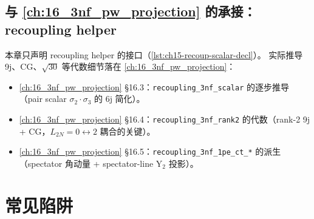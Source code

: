\subsection{与 \cref{ch:16_3nf_pw_projection} 的承接：recoupling helper}
\label{subsec:ch15-coupling-pw-proj}

本章只声明 recoupling helper 的接口（\cref{lst:ch15-recoup-scalar-decl}）。
实际推导 9j、CG、\(\sqrt{30}\) 等代数细节落在 \cref{ch:16_3nf_pw_projection}：
\begin{itemize}
\item \cref{ch:16_3nf_pw_projection} \S 16.3：\texttt{recoupling\_3nf\_scalar}
      的逐步推导（pair scalar \(\sigma_2 \cdot \sigma_3\) 的 6j 简化）。
\item \cref{ch:16_3nf_pw_projection} \S 16.4：\texttt{recoupling\_3nf\_rank2}
      的代数（rank-2 9j + CG，\(L_{2N} = 0 \leftrightarrow 2\) 耦合的关键）。
\item \cref{ch:16_3nf_pw_projection} \S 16.5：\texttt{recoupling\_3nf\_1pe\_ct\_*}
      的派生（spectator 角动量 + spectator-line Y\(_2\) 投影）。
\end{itemize}

\section{常见陷阱}
\label{sec:ch15-pitfalls}

